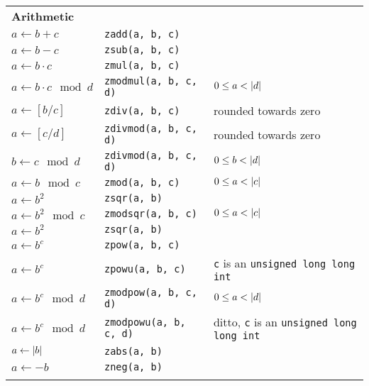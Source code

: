 \documentclass[10pt,draft]{article}
\DeclarePairedDelimiter\ab{\lvert}{\rvert}
\begin{document}
\begin{tabular}{lll}
\textbf{Arithmetic}           & {}                         & {}                                                \\
$a \gets b + c$               & {\tt zadd(a, b, c)}        &                                                   \\
$a \gets b - c$               & {\tt zsub(a, b, c)}        &                                                   \\
$a \gets b \cdot c$           & {\tt zmul(a, b, c)}        &                                                   \\
$a \gets b \cdot c \mod d$    & {\tt zmodmul(a, b, c, d)}  & $0 \le a < \ab{d}$                                \\
$a \gets [b / c]$             & {\tt zdiv(a, b, c)}        & rounded towards zero                              \\
$a \gets [c / d]$             & {\tt zdivmod(a, b, c, d)}  & rounded towards zero                              \\
$b \gets c \mod d$            & {\tt zdivmod(a, b, c, d)}  & $0 \le b < \ab{d}$                                \\
$a \gets b \mod c$            & {\tt zmod(a, b, c)}        & $0 \le a < \ab{c}$                                \\
$a \gets b^2$                 & {\tt zsqr(a, b)}           &                                                   \\
$a \gets b^2 \mod c$          & {\tt zmodsqr(a, b, c)}     & $0 \le a < \ab{c}$                                \\
$a \gets b^2$                 & {\tt zsqr(a, b)}           &                                                   \\
$a \gets b^c$                 & {\tt zpow(a, b, c)}        &                                                   \\
$a \gets b^c$                 & {\tt zpowu(a, b, c)}       & {\tt c} is an {\tt unsigned long long int}        \\
$a \gets b^c \mod d$          & {\tt zmodpow(a, b, c, d)}  & $0 \le a < \ab{d}$                                \\
$a \gets b^c \mod d$          & {\tt zmodpowu(a, b, c, d)} & ditto, {\tt c} is an {\tt unsigned long long int} \\
$a \gets \ab{b}$              & {\tt zabs(a, b)}           &                                                   \\
$a \gets -b$                  & {\tt zneg(a, b)}           &                                                   \\
\\


\end{tabular}
\end{document}
